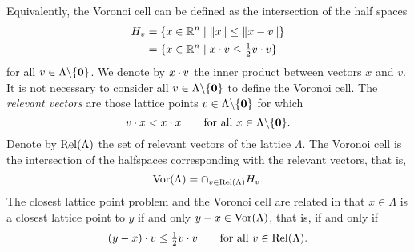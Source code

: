 \documentclass[final,leqno]{siamltex}
\begin{document}
Equivalently, the Voronoi cell can be defined as the intersection of the half spaces 
\begin{align*}
H_{v} &= \{x \in {\mathbb R}^n \mid \|x\| \leq \|x - v\| \} \\
&= \{x \in {\mathbb R}^n \mid x \cdot v \leq \tfrac{1}{2}v \cdot v \}
\end{align*}
for all $v \in \Lambda \backslash  \{\boldsymbol{0}\}$.  %
We denote by $x \cdot v$ the inner product between vectors $x$ and $v$.
It is not necessary to consider all $v \in \Lambda \backslash  \{\boldsymbol{0}\}$ to define the Voronoi cell.   %
The \emph{relevant vectors} are those lattice points $v \in \Lambda \backslash  \{\boldsymbol{0}\}$ for which  
\[
v \cdot x < x \cdot x \qquad \text{for all $x \in \Lambda \backslash  \{\boldsymbol{0}\}$}.
\]
Denote by $\operatorname{Rel}(\Lambda)$ the set of relevant vectors of the lattice $\Lambda$.  The Voronoi cell is the intersection of the halfspaces corresponding with the relevant vectors, that is, 
\[
\operatorname{Vor}(\Lambda) = \cap_{v\in\operatorname{Rel}(\Lambda)}{H_{v}}.
\]
The closest lattice point problem and the Voronoi cell are related in that $x\in\Lambda$ is a closest lattice point to $y$ if and only $y - x \in \operatorname{Vor}(\Lambda)$, that is, if and only if
\begin{equation}\label{eq:relvectnearpointieq}
\dotprod{(y - x)}{v} \leq \tfrac{1}{2} \dotprod{v}{v} \qquad \text{for all $v \in \relevant(\Lambda)$}.  
\end{equation} 

\end{document}
